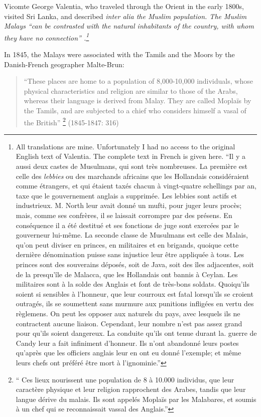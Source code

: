 Vicomte George Valentia, who traveled through the Orient in the early 1800s, visited Sri Lanka, and described \em inter alia \em the Muslim population. The Muslim Malays ``can be contrasted with the natural inhabitants of the country, with whom they have no connection'' \citep{Valentia1813}.\footnote{All
 translations are mine. Unfortunately I had no access to the original English text of Valentia. The complete text in French is given here. ``Il y a aussi deux castes de Musulmans, qui sont très nombreuses. La première est celle des \textit{lebbies} ou des marchands africains que les Hollandais considéraient comme étrangers, et qui étaient taxés chacun à vingt-quatre schellings par an, taxe que le gouvernement anglais a supprimée. Les lebbies sont actifs et industrieux. M. North leur avait donné un mufti, pour juger leurs procès; mais, comme ses confrères, il se laissait corrompre par des présens. En conséquence il a été destitué et ses fonctions de juge sont exercées par le gouverneur lui-même. La seconde classe de Musulmans est celle des Malais, qu'on peut diviser en princes, en militaires et en brigands, quoique cette dernière dénomination puisse sans injustice leur être appliquée à tous. Les princes sont des souverains déposés, soit de Java, soit des îles adjacentes, soit de la presqu'île de Malacca, que les Hollandais ont bannis à Ceylan. Les militaires sont à la solde des Anglais et font de très-bons soldats. Quoiqu'ils soient si sensibles à l'honneur, que leur courroux est fatal lorsqu'ils se croient outragés, ils se soumettent sans murmure aux punitions infligées en vertu des règlemens. On peut les opposer aux naturels du pays, avec lesquels ils ne contractent aucune liaison. Cependant, leur nombre n'est pas assez grand pour qu'ils soient dangereux. La conduite qu'ils ont tenue durant la. guerre de Candy leur a fait infiniment d'honneur. Ils n'ont abandonné leurs postes qu'après que les officiers anglais leur en ont eu donné l'exemple; et même leurs chefs ont préféré être mort à l'ignominie.'' 
}

In 1845, the Malays were associated with the Tamils and the Moors by the Danish-French geographer Malte-Brun: 

\begin{quote}
``These places are home to a population of 8,000-10,000 individuals, whose physical characteristics and religion are similar to those of the Arabs, whereas their language is derived from Malay. They are called Mopla\"is by the Tamils, and are subjected to a chief who considers himself a vasal of the British'' \footnote{``
 Ces lieux nourissent une population de 8 à 10.000 individus, que leur caractère physique et leur religion rapprochent des Arabes, tandis que leur langue dérive du malais. Ils sont appelés Mopla\"is par les Malabares, et soumis à un chef qui se reconnaissait vassal des Anglais.''
} (1845-1847: 316)
\end{quote}

